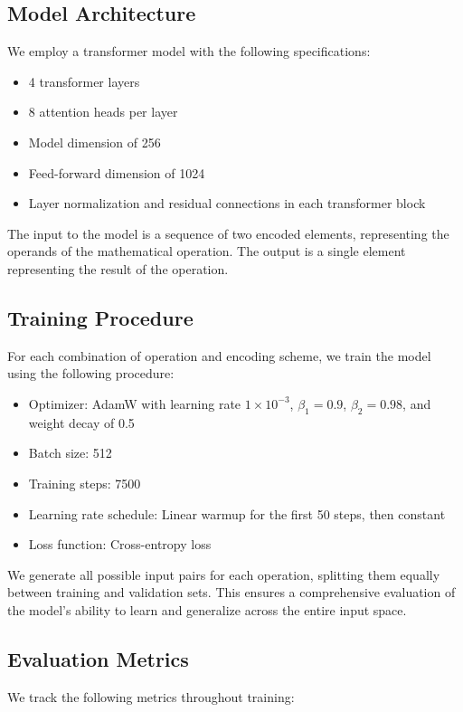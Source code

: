 \documentclass{article} %
\begin{document}
\subsection{Model Architecture}
We employ a transformer model with the following specifications:

\begin{itemize}
    \item 4 transformer layers
    \item 8 attention heads per layer
    \item Model dimension of 256
    \item Feed-forward dimension of 1024
    \item Layer normalization and residual connections in each transformer block
\end{itemize}

The input to the model is a sequence of two encoded elements, representing the operands of the mathematical operation. The output is a single element representing the result of the operation.

\subsection{Training Procedure}
For each combination of operation and encoding scheme, we train the model using the following procedure:

\begin{itemize}
    \item Optimizer: AdamW with learning rate $1 \times 10^{-3}$, $\beta_1 = 0.9$, $\beta_2 = 0.98$, and weight decay of 0.5
    \item Batch size: 512
    \item Training steps: 7500
    \item Learning rate schedule: Linear warmup for the first 50 steps, then constant
    \item Loss function: Cross-entropy loss
\end{itemize}

We generate all possible input pairs for each operation, splitting them equally between training and validation sets. This ensures a comprehensive evaluation of the model's ability to learn and generalize across the entire input space.

\subsection{Evaluation Metrics}
We track the following metrics throughout training:
\end{document}
